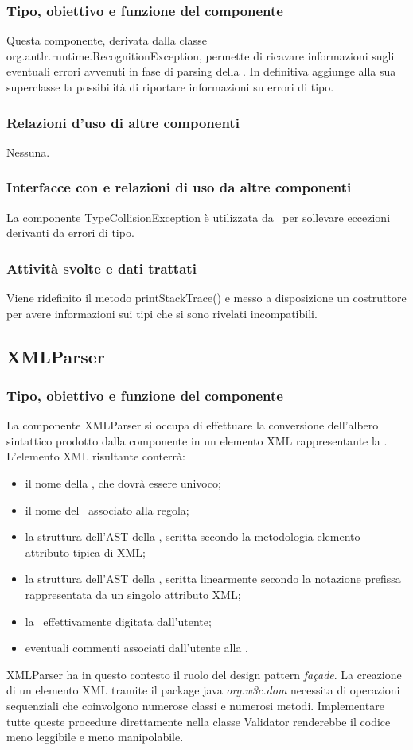 \documentclass[11pt,titlepage,a4paper]{report}
\begin{document}
\subsubsection{Tipo, obiettivo e funzione del componente}
Questa componente, derivata dalla classe\\ org.antlr.runtime.RecognitionException, permette di ricavare informazioni sugli eventuali errori avvenuti in fase di parsing della \br. In definitiva aggiunge alla sua superclasse la possibilit\`a di riportare informazioni su errori di tipo.
\subsubsection{Relazioni d'uso di altre componenti}
Nessuna.
\subsubsection{Interfacce con e relazioni di uso da altre componenti}
La componente TypeCollisionException \`e utilizzata da \brp\ per sollevare eccezioni derivanti da errori di tipo.
\subsubsection{Attivit\`a svolte e dati trattati}
Viene ridefinito il metodo printStackTrace() e messo a disposizione un costruttore per avere informazioni sui tipi che si sono rivelati incompatibili.

\subsection{XMLParser}%
\subsubsection{Tipo, obiettivo e funzione del componente}
La componente XMLParser si occupa di effettuare la conversione dell'albero sintattico prodotto dalla componente \brp in un elemento XML rappresentante la \br. L'elemento XML risultante conterr\`a:
\begin{itemize}
 \item il nome della \br, che dovr\`a essere univoco;
 \item il nome del \bo\ associato alla regola;
 \item la struttura dell'AST della \br, scritta secondo la metodologia elemento-attributo tipica di XML;
 \item la struttura dell'AST della \br, scritta linearmente secondo la notazione prefissa rappresentata da un singolo attributo XML;
 \item la \br\ effettivamente digitata dall'utente;
 \item eventuali commenti associati dall'utente alla \br.
\end{itemize}
XMLParser ha in questo contesto il ruolo del design pattern \textit{fa\c{c}ade}. La creazione di un elemento XML tramite il package java \textit{org.w3c.dom} necessita di operazioni sequenziali che coinvolgono numerose classi e numerosi metodi. Implementare tutte queste procedure direttamente nella classe Validator renderebbe il codice meno leggibile e meno manipolabile.
\end{document}
